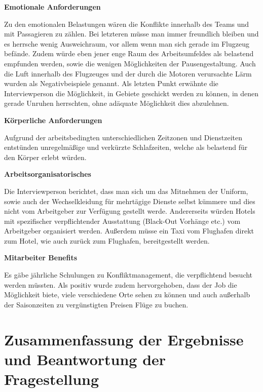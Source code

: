 \documentclass[12pt, a4paper]{article}
\begin{document}
\textbf{Emotionale Anforderungen}

Zu den emotionalen Belastungen wären die Konflikte innerhalb des Teams und mit Passagieren zu zählen.
Bei letzteren müsse man immer freundlich bleiben und es herrsche wenig Ausweichraum, vor allem wenn man sich gerade im Flugzeug befände.
Zudem würde eben jener enge Raum des Arbeitsumfeldes als belastend empfunden werden, sowie die wenigen Möglichkeiten der Pausengestaltung. 
Auch die Luft innerhalb des Flugzeuges und der durch die Motoren verursachte Lärm wurden als Negativbeispiele genannt. 
Als letzten Punkt erwähnte die Interviewperson die Möglichkeit, in Gebiete geschickt werden zu können, 
in denen gerade Unruhen herrschten, ohne adäquate Möglichkeit dies abzulehnen.

\textbf{Körperliche Anforderungen}

Aufgrund der arbeitsbedingten unterschiedlichen Zeitzonen und Dienstzeiten entstünden unregelmäßige und verkürzte Schlafzeiten,
welche als belastend für den Körper erlebt würden.

\textbf{Arbeitsorganisatorisches}

Die Interviewperson berichtet, dass man sich um das Mitnehmen der Uniform, sowie auch der Wechselkleidung für mehrtägige
Dienste selbst kümmere und dies nicht vom Arbeitgeber zur Verfügung gestellt werde.
Andererseits würden Hotels mit spezifischer verpflichtender Ausstattung (Black-Out Vorhänge etc.) vom Arbeitgeber organisiert werden.
Außerdem müsse ein Taxi vom Flughafen direkt zum Hotel, wie auch zurück zum Flughafen, bereitgestellt werden.

\textbf{Mitarbeiter Benefits}

Es gäbe jährliche Schulungen zu Konfliktmanagement, die verpflichtend besucht werden müssten.
Als positiv wurde zudem hervorgehoben, dass der Job die Möglichkeit biete, viele verschiedene Orte sehen zu können und
auch außerhalb der Saisonzeiten zu vergünstigten Preisen Flüge zu buchen.

\section{Zusammenfassung der Ergebnisse und Beantwortung der Fragestellung}
\end{document}
